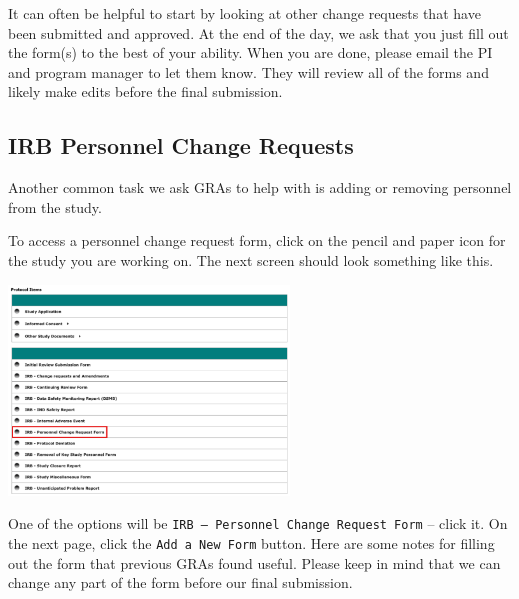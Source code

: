 \documentclass[
  letterpaper,
  DIV=11,
  numbers=noendperiod]{scrreprt}
\begin{document}
It can often be helpful to start by looking at other change requests
that have been submitted and approved. At the end of the day, we ask
that you just fill out the form(s) to the best of your ability. When you
are done, please email the PI and program manager to let them know. They
will review all of the forms and likely make edits before the final
submission.

\subsection{IRB Personnel Change
Requests}\label{irb-personnel-change-requests}

Another common task we ask GRAs to help with is adding or removing
personnel from the study.

To access a personnel change request form, click on the pencil and paper
icon for the study you are working on. The next screen should look
something like this.

\begin{center}
\includegraphics[width=2.94in,height=\textheight]{chapters/gra_tasks/../../graphics/personnel_change.png}
\end{center}

One of the options will be
\texttt{IRB\ –\ Personnel\ Change\ Request\ Form} -- click it. On the
next page, click the \texttt{Add\ a\ New\ Form} button. Here are some
notes for filling out the form that previous GRAs found useful. Please
keep in mind that we can change any part of the form before our final
submission.
\end{document}
